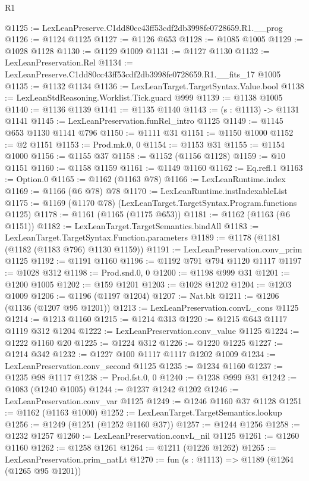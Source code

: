 \begin{lexlean}{R1}
\begin{coremodule}
@1125 := LexLeanPreserve.C1dd80cc43ff53cdf2db3998fe0728659.R1.__prog
@1126 := @1124 @1125
@1127 := @1126 @653
@1128 := @1085 @1005
@1129 := @1028 @1128
@1130 := @1129 @1009
@1131 := @1127 @1130
@1132 := LexLeanPreservation.Rel
@1134 := LexLeanPreserve.C1dd80cc43ff53cdf2db3998fe0728659.R1.__fits_17 @1005
@1135 := @1132 @1134
@1136 := LexLeanTarget.TargetSyntax.Value.bool
@1138 := LexLeanStdReasoning.Worklist.Tick.guard @999
@1139 := @1138 @1005
@1140 := @1136 @1139
@1141 := @1135 @1140
@1143 := (s : @1113) -> @1131 @1141
@1145 := LexLeanPreservation.funRel_intro @1125
@1149 := @1145 @653 @1130 @1141 @796
@1150 := @1111 @31
@1151 := @1150 @1000
@1152 := @2 @1151
@1153 := Prod.mk.{0, 0}
@1154 := @1153 @31
@1155 := @1154 @1000
@1156 := @1155 @37
@1158 := @1152 (@1156 @1128)
@1159 := @10 @1151
@1160 := @1158 @1159
@1161 := @1149 @1160
@1162 := Eq.refl.{1}
@1163 := Option.{0}
@1165 := @1162 (@1163 @78)
@1166 := LexLeanRuntime.index
@1169 := @1166 (@6 @78) @78
@1170 := LexLeanRuntime.instIndexableList
@1175 := @1169 (@1170 @78) (LexLeanTarget.TargetSyntax.Program.functions @1125)
@1178 := @1161 (@1165 (@1175 @653))
@1181 := @1162 (@1163 (@6 @1151))
@1182 := LexLeanTarget.TargetSemantics.bindAll
@1183 := LexLeanTarget.TargetSyntax.Function.parameters
@1189 := @1178 (@1181 (@1182 (@1183 @796) @1130 @1159))
@1191 := LexLeanPreservation.conv_prim @1125
@1192 := @1191 @1160
@1196 := @1192 @791 @794 @1120 @1117
@1197 := @1028 @312
@1198 := Prod.snd.{0, 0}
@1200 := @1198 @999 @31
@1201 := @1200 @1005
@1202 := @159 @1201
@1203 := @1028 @1202
@1204 := @1203 @1009
@1206 := @1196 (@1197 @1204)
@1207 := Nat.blt
@1211 := @1206 (@1136 (@1207 @95 @1201))
@1213 := LexLeanPreservation.convL_cons @1125
@1214 := @1213 @1160
@1215 := @1214 @313
@1220 := @1215 @643 @1117 @1119 @312 @1204
@1222 := LexLeanPreservation.conv_value @1125
@1224 := @1222 @1160 @20
@1225 := @1224 @312
@1226 := @1220 @1225
@1227 := @1214 @342
@1232 := @1227 @100 @1117 @1117 @1202 @1009
@1234 := LexLeanPreservation.conv_second @1125
@1235 := @1234 @1160
@1237 := @1235 @98 @1117
@1238 := Prod.fst.{0, 0}
@1240 := @1238 @999 @31
@1242 := @1083 (@1240 @1005)
@1244 := @1237 @1242 @1202
@1246 := LexLeanPreservation.conv_var @1125
@1249 := @1246 @1160 @37 @1128
@1251 := @1162 (@1163 @1000)
@1252 := LexLeanTarget.TargetSemantics.lookup
@1256 := @1249 (@1251 (@1252 @1160 @37))
@1257 := @1244 @1256
@1258 := @1232 @1257
@1260 := LexLeanPreservation.convL_nil @1125
@1261 := @1260 @1160
@1262 := @1258 @1261
@1264 := @1211 (@1226 @1262)
@1265 := LexLeanPreservation.prim_natLt
@1270 := fun (s : @1113) => @1189 (@1264 (@1265 @95 @1201))

\end{coremodule}
\end{lexlean}
